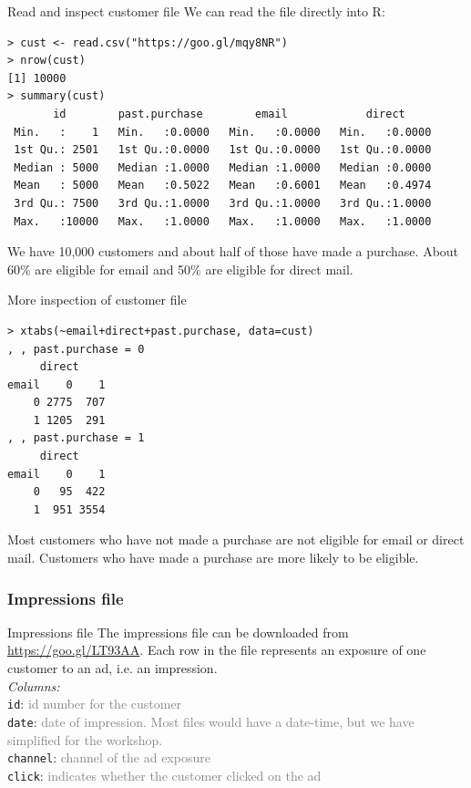 \documentclass[10pt, aspectratio=169]{beamer}
\begin{document}
\begin{frame}[fragile]{Read and inspect \alert{customer file}}
We can read the file directly into R: 
\begin{lstlisting}
> cust <- read.csv("https://goo.gl/mqy8NR")
> nrow(cust)
[1] 10000
> summary(cust)
       id        past.purchase        email            direct      
 Min.   :    1   Min.   :0.0000   Min.   :0.0000   Min.   :0.0000  
 1st Qu.: 2501   1st Qu.:0.0000   1st Qu.:0.0000   1st Qu.:0.0000  
 Median : 5000   Median :1.0000   Median :1.0000   Median :0.0000  
 Mean   : 5000   Mean   :0.5022   Mean   :0.6001   Mean   :0.4974  
 3rd Qu.: 7500   3rd Qu.:1.0000   3rd Qu.:1.0000   3rd Qu.:1.0000  
 Max.   :10000   Max.   :1.0000   Max.   :1.0000   Max.   :1.0000  
\end{lstlisting}
\alert{We have 10,000 customers and about half of those have made a purchase. About 60\% are eligible for email and 50\% are eligible for direct mail.}
\end{frame}

\begin{frame}[fragile]{More inspection of \alert{customer file}}
\begin{lstlisting}
> xtabs(~email+direct+past.purchase, data=cust)
, , past.purchase = 0
     direct
email    0    1
    0 2775  707
    1 1205  291
, , past.purchase = 1
     direct
email    0    1
    0   95  422
    1  951 3554
\end{lstlisting}
\alert{Most customers who have not made a purchase are not eligible for email or direct mail. Customers who have made a purchase are more likely to be eligible.}
\end{frame}

\subsubsection{Impressions file}

\begin{frame}[fragile]{\alert{Impressions file}}
The impressions file can be downloaded from \href{https://goo.gl/LT93AA}{https://goo.gl/LT93AA}. Each row in the file represents an exposure of one customer to an ad, i.e. an impression.\\
\bigskip
\emph{Columns:} \\
\verb|id|: \textcolor{gray}{id number for the customer}\\
\verb|date|: \textcolor{gray}{date of impression. Most files would have a date-time, but we have simplified for the workshop.}  \\
\verb|channel|: \textcolor{gray}{channel of the ad exposure} \\
\verb|click|: \textcolor{gray}{indicates whether the customer clicked on the ad} \\
\end{frame}
\end{document}
